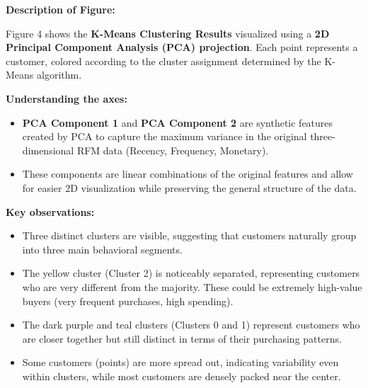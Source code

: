 \documentclass[12pt]{article}
\begin{document}
\noindent
\textbf{Description of Figure:} \\

\vspace{0.2cm}

Figure 4 shows the \textbf{K-Means Clustering Results} visualized using a \textbf{2D Principal Component Analysis (PCA) projection}.  
Each point represents a customer, colored according to the cluster assignment determined by the K-Means algorithm.

\vspace{0.4cm}

\textbf{Understanding the axes:}
\begin{itemize}
    \item \textbf{PCA Component 1} and \textbf{PCA Component 2} are synthetic features created by PCA to capture the maximum variance in the original three-dimensional RFM data (Recency, Frequency, Monetary).
    \item These components are linear combinations of the original features and allow for easier 2D visualization while preserving the general structure of the data.
\end{itemize}

\vspace{0.4cm}

\textbf{Key observations:}
\begin{itemize}
    \item Three distinct clusters are visible, suggesting that customers naturally group into three main behavioral segments.
    \item The yellow cluster (Cluster 2) is noticeably separated, representing customers who are very different from the majority. These could be extremely high-value buyers (very frequent purchases, high spending).
    \item The dark purple and teal clusters (Clusters 0 and 1) represent customers who are closer together but still distinct in terms of their purchasing patterns.
    \item Some customers (points) are more spread out, indicating variability even within clusters, while most customers are densely packed near the center.
\end{itemize}

\vspace{0.4cm}
\end{document}

